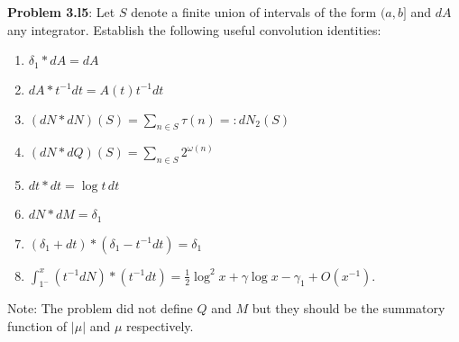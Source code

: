 \documentclass{article}
\begin{document}
\fi

\textbf{Problem 3.l5}: Let $S$ denote a finite union of intervals of the form $(a, b]$ and $dA$ any integrator. Establish the following useful convolution identities:
\begin{enumerate}
\item $\delta_1 * dA = dA$
\item $dA * t^{-1} dt = A(t) t^{-1} dt$
\item $(dN * dN)(S) = \sum_{n \in S} \tau(n) =: d N_2(S)$
\item $(dN * dQ)(S) = \sum_{n \in S} 2^{\omega(n)}$
\item $dt * dt = \log t \, dt$
\item $dN * dM = \delta_1$
\item $(\delta_1 + dt) * (\delta_1 - t^{-1} dt) = \delta_1$
\item $\int_{1^-}^x (t^{-1}dN) * (t^{-1}dt) = \frac12 \log^2 x + \gamma \log x - \gamma_1 + O(x^{-1})$.
\end{enumerate}

Note: The problem did not define $Q$ and $M$ but they should be the summatory function of $|\mu|$ and $\mu$ respectively.
\end{document}
